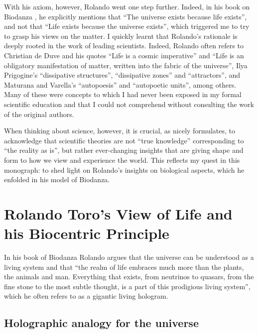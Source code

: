 \documentclass[
  11pt,
]{book}
\begin{document}
With his axiom, however, Rolando went one step further. Indeed, in his book on Biodanza \citep{toro2008}, he explicitly mentions that ``The universe exists because life exists'', and not that ``Life exists because the universe exists'', which triggered me to try to grasp his views on the matter. I quickly learnt that Rolando's rationale is deeply rooted in the work of leading scientists. Indeed, Rolando often refers to Christian de Duve and his quotes ``Life is a cosmic imperative'' and ``Life is an obligatory manifestation of matter, written into the fabric of the universe'', Ilya Prigogine's ``dissipative structures'', ``dissipative zones'' and ``attractors'', and Maturana and Varella's ``autopoesis'' and ``autopoetic units'', among others. Many of these were concepts to which I had never been exposed in my formal scientific education and that I could not comprehend without consulting the work of the original authors.

When thinking about science, however, it is crucial, as \citet{bohm1980} nicely formulates, to acknowledge that scientific theories are not ``true knowledge'' corresponding to ``the reality as is'', but rather ever-changing insights that are giving shape and form to how we view and experience the world. This reflects my quest in this monograph: to shed light on Rolando's insights on biological aspects, which he enfolded in his model of Biodanza.

\hypertarget{rolando-toros-view-of-life-and-his-biocentric-principle}{%
\section{Rolando Toro's View of Life and his Biocentric Principle}\label{rolando-toros-view-of-life-and-his-biocentric-principle}}

In his book of Biodanza Rolando argues that the universe can be understood as a living system and that ``the realm of life embraces much more than the plants, the animals and man. Everything that exists, from neutrinos to quasars, from the fine stone to the most subtle thought, is a part of this prodigious living system'', which he often refers to as a gigantic living hologram.

\hypertarget{holographic-analogy-for-the-universe}{%
\subsection{Holographic analogy for the universe}\label{holographic-analogy-for-the-universe}}
\end{document}
